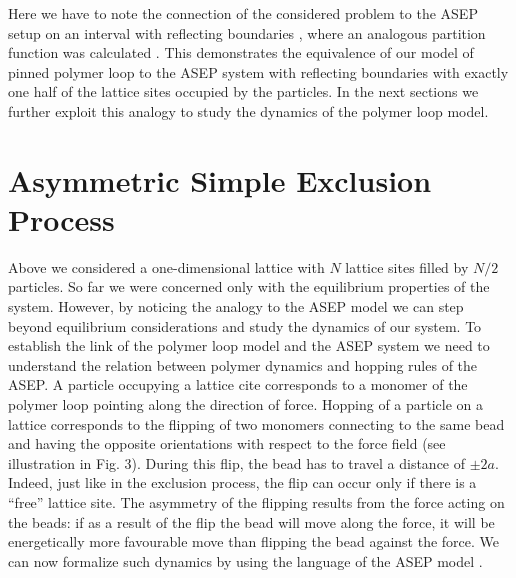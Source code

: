 \documentclass[aps,showpacs,twocolumn,floatfix,prx,superscriptaddress]{revtex4-1}
\begin{document}
Here we have to note the connection of the considered problem to the ASEP setup
on an interval with reflecting boundaries \cite{}, where an analogous partition
function was calculated \cite{}. This demonstrates the equivalence of our model
of pinned polymer loop to the ASEP system with reflecting boundaries with
exactly one half of the lattice sites occupied by the particles. In the next
sections we further exploit this analogy to study the dynamics of the polymer
loop model.

\section{Asymmetric Simple Exclusion Process}\label{sec:asep}
Above we considered a one-dimensional lattice with $N$ lattice sites filled by
$N/2$ particles. So far we were concerned only with the equilibrium properties
of the system. However, by noticing the analogy to the ASEP model we can step
beyond equilibrium considerations and study the dynamics of our system. To
establish the link of the polymer loop model and the ASEP system we need to
understand the relation between polymer dynamics and hopping rules of the ASEP.
A particle occupying a lattice cite corresponds to a monomer of the polymer loop
pointing along the direction of force. Hopping of a particle on a lattice
corresponds to the flipping of two monomers connecting to the same bead and
having the opposite orientations with respect to the force field (see
illustration in Fig. 3). During this flip, the bead has to travel a distance of
$\pm2a$. Indeed, just like in the exclusion process, the flip can occur only if
there is a ``free'' lattice site. The asymmetry of the flipping results from the
force acting on the beads: if as a result of the flip the bead will move along
the force, it will be energetically more favourable move than flipping the bead
against the force. We can now formalize such dynamics by using the language of
the ASEP model \cite{Derrida1998,Schutz2001}. 
 
\end{document}
